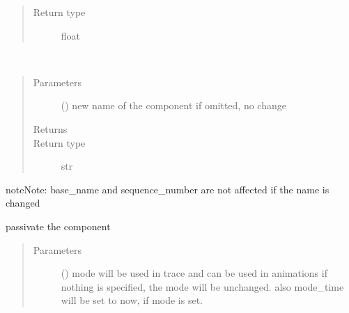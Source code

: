 \documentclass[letterpaper,10pt,english]{sphinxmanual}
\begin{document}
\begin{fulllineitems}
\begin{fulllineitems}
\begin{quote}
\begin{description}
\item[{Return type}] \leavevmode
float

\end{description}\end{quote}

\end{fulllineitems}


\begin{fulllineitems}
\label{\detokenize{Reference:salabim.Component.name}}~\begin{quote}\begin{description}
\item[{Parameters}] \leavevmode
{} () \textendash{} new name of the component
if omitted, no change

\item[{Returns}] \leavevmode
{}

\item[{Return type}] \leavevmode
str

\end{description}\end{quote}

\begin{sphinxadmonition}{note}{Note:}
base\_name and sequence\_number are not affected if the name is changed
\end{sphinxadmonition}

\end{fulllineitems}


\begin{fulllineitems}
\label{\detokenize{Reference:salabim.Component.passivate}}
passivate the component
\begin{quote}\begin{description}
\item[{Parameters}] \leavevmode
{} () \textendash{} mode 
will be used in trace and can be used in animations 
if nothing is specified, the mode will be unchanged. 
also mode\_time will be set to now, if mode is set.


\end{description}
\end{quote}
\end{fulllineitems}
\end{fulllineitems}
\end{document}
